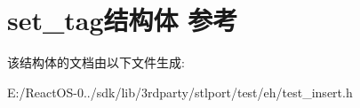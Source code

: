 \hypertarget{structset__tag}{}\section{set\+\_\+tag结构体 参考}
\label{structset__tag}


该结构体的文档由以下文件生成\+:\begin{DoxyCompactItemize}
\item 
E\+:/\+React\+O\+S-\/0../sdk/lib/3rdparty/stlport/test/eh/test\+\_\+insert.\+h\end{DoxyCompactItemize}
